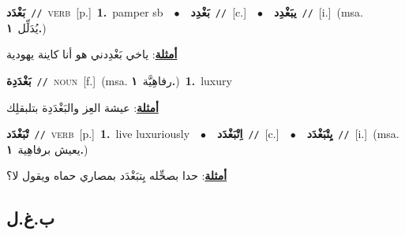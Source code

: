 \documentclass[10pt,a4paper,twoside]{article} %
\begin{document}
\begin{multicols}{2}
{\setlength\topsep{0pt}\textbf{\foreignlanguage{arabic}{بَغْدَد}}\ {\color{gray}\texttt{//}\color{black}}\ \textsc{verb}\ [p.]\ \textbf{1.}~pamper sb\ \ $\bullet$\ \ \setlength\topsep{0pt}\textbf{\foreignlanguage{arabic}{بَغْدِد}}\ {\color{gray}\texttt{//}\color{black}}\ [c.]\ \ $\bullet$\ \ \setlength\topsep{0pt}\textbf{\foreignlanguage{arabic}{يبَغْدِد}}\ {\color{gray}\texttt{//}\color{black}}\ [i.]\ \color{gray}(msa. \foreignlanguage{arabic}{يُدَلِّل}~\foreignlanguage{arabic}{\textbf{١.}})\color{black}\  \begin{flushright}\color{gray}\foreignlanguage{arabic}{\textbf{\underline{\foreignlanguage{arabic}{أمثلة}}}: ياخي بَغْدِدني هو أنا كاينة يهودية}\end{flushright}\color{black}} \vspace{2mm}

{\setlength\topsep{0pt}\textbf{\foreignlanguage{arabic}{بَغْدَدِة}}\ {\color{gray}\texttt{//}\color{black}}\ \textsc{noun}\ [f.]\ \color{gray}(msa. \foreignlanguage{arabic}{رفاهِيَّة}~\foreignlanguage{arabic}{\textbf{١.}})\color{black}\ \textbf{1.}~luxury\  \begin{flushright}\color{gray}\foreignlanguage{arabic}{\textbf{\underline{\foreignlanguage{arabic}{أمثلة}}}: عيشة العِز والبَغْدَدِة بتلبقلِك}\end{flushright}\color{black}} \vspace{2mm}

{\setlength\topsep{0pt}\textbf{\foreignlanguage{arabic}{تْبَغْدَد}}\ {\color{gray}\texttt{//}\color{black}}\ \textsc{verb}\ [p.]\ \textbf{1.}~live luxuriously\ \ $\bullet$\ \ \setlength\topsep{0pt}\textbf{\foreignlanguage{arabic}{اِتْبَغْدَد}}\ {\color{gray}\texttt{//}\color{black}}\ [c.]\ \ $\bullet$\ \ \setlength\topsep{0pt}\textbf{\foreignlanguage{arabic}{يِتْبَغْدَد}}\ {\color{gray}\texttt{//}\color{black}}\ [i.]\ \color{gray}(msa. \foreignlanguage{arabic}{يعيش برفاهِية}~\foreignlanguage{arabic}{\textbf{١.}})\color{black}\  \begin{flushright}\color{gray}\foreignlanguage{arabic}{\textbf{\underline{\foreignlanguage{arabic}{أمثلة}}}: حدا بصحِّله يِتبَغْدَد بمصاري حماه ويقول لا؟}\end{flushright}\color{black}} \vspace{2mm}

\vspace{-3mm}
\subsection*{\color{blue}\foreignlanguage{arabic}{ب.غ.ل}\color{blue}{}} 


\end{multicols}
\end{document}
